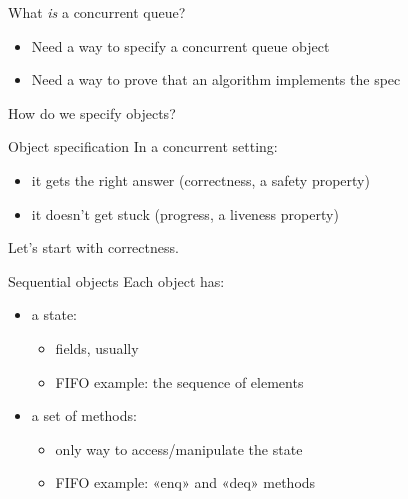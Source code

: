 \documentclass{beamer}
\begin{document}
\begin{frame}{What \emph{is} a concurrent queue?}{}
  \begin{itemize}
    \item Need a way to \alert{specify} a concurrent queue object
    \item Need a way to \alert{prove} that an algorithm implements the
      spec
  \end{itemize}
  \pause
  How do we specify objects?
\end{frame}

\begin{frame}{Object specification}{}
  In a concurrent setting:
  \begin{itemize}
    \item it gets the right answer (correctness, a safety property)
    \item it doesn’t get stuck (progress, a liveness property)
  \end{itemize}
  Let’s start with correctness.
\end{frame}

\begin{frame}{Sequential objects}{}
  Each object has:
  \begin{itemize}
    \item a \alert{state}:
      \begin{itemize}
        \item fields, usually
        \item FIFO example: the sequence of elements
      \end{itemize}
    \item a set of \alert{methods}:
      \begin{itemize}
        \item only way to access/manipulate the state
        \item FIFO example: «enq» and «deq» methods
      \end{itemize}
  \end{itemize}
\end{frame}
\end{document}
